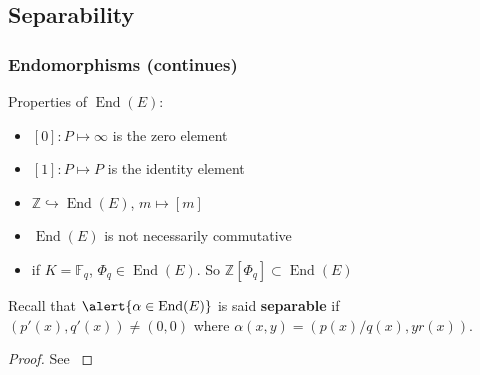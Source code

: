 \documentclass[12pt,handout]{beamer} %
\newcommand{\Z}{\mathbb Z}
\newcommand{\F}{\mathbb F}
\theoremstyle{definition}
\begin{document}
\subsection{Separability}
\begin{frame}
\frametitle{Endomorphisms (continues)}

\begin{block}{Properties of $\operatorname{End}(E)$:}
\begin{itemize}[<+-|alert@+>]
  \item \alert{$[0]:P\mapsto\infty$} is the zero element
  \item \alert{$[1]:P\mapsto P$} is the identity element
  \item \alert{$\Z\hookrightarrow\operatorname{End}(E)$}, $m\mapsto [m]$
  \item \alert{$\operatorname{End}(E)$} is not necessarily commutative
  \item if $K=\F_q$, \alert{$\Phi_q\in\operatorname{End}(E)$}. So \alert{$\Z[\Phi_q]\subset\operatorname{End}(E)$}
\end{itemize}\pause
\end{block}

Recall that $\alert{\alpha\in \operatorname{End}(E)}$ is said \textbf{separable}
 if $(p'(x),q'(x))\neq(0,0)$ where $\alpha(x,y)=(p(x)/q(x),yr(x))$.\pause

\pause

\begin{proof}
See \cite[Proposition 2.29]{washington}
\end{proof}

\end{frame}
\end{document}
